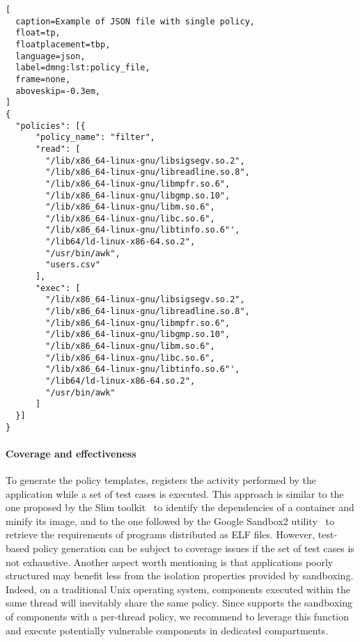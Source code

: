 \begin{lstlisting}[
  caption=Example of JSON file with single policy,
  float=tp,
  floatplacement=tbp,
  language=json,
  label=dmng:lst:policy_file,
  frame=none,
  aboveskip=-0.3em,
]
{
  "policies": [{
      "policy_name": "filter",
      "read": [
        "/lib/x86_64-linux-gnu/libsigsegv.so.2",
        "/lib/x86_64-linux-gnu/libreadline.so.8",
        "/lib/x86_64-linux-gnu/libmpfr.so.6",
        "/lib/x86_64-linux-gnu/libgmp.so.10",
        "/lib/x86_64-linux-gnu/libm.so.6",
        "/lib/x86_64-linux-gnu/libc.so.6",
        "/lib/x86_64-linux-gnu/libtinfo.so.6"',
        "/lib64/ld-linux-x86-64.so.2",
        "/usr/bin/awk",
        "users.csv"
      ],
      "exec": [
        "/lib/x86_64-linux-gnu/libsigsegv.so.2",
        "/lib/x86_64-linux-gnu/libreadline.so.8",
        "/lib/x86_64-linux-gnu/libmpfr.so.6",
        "/lib/x86_64-linux-gnu/libgmp.so.10",
        "/lib/x86_64-linux-gnu/libm.so.6",
        "/lib/x86_64-linux-gnu/libc.so.6",
        "/lib/x86_64-linux-gnu/libtinfo.so.6"',
        "/lib64/ld-linux-x86-64.so.2",
        "/usr/bin/awk"
      ]
  }]
}
\end{lstlisting}

\paragraph*{Coverage and effectiveness}

To generate the policy templates, \dmng registers the activity
performed by the application while a set of test cases is
executed. This approach is similar to the one proposed by the Slim
toolkit~\cite{slimtoolkit} to identify the dependencies of a container
and minify its image, and to the one followed by the Google Sandbox2
utility~\cite{sandbox2} to retrieve the requirements of programs
distributed as ELF files. However, test-based policy generation can be
subject to coverage issues if the set of test cases is not
exhaustive. Another aspect worth mentioning is that applications
poorly structured may benefit less from the isolation properties
provided by sandboxing. Indeed, on a traditional Unix operating
system, components executed within the same thread will inevitably
share the same policy. Since \dmng supports the sandboxing of
components with a per-thread policy, we recommend to leverage this
function and execute potentially vulnerable components in dedicated
compartments.

